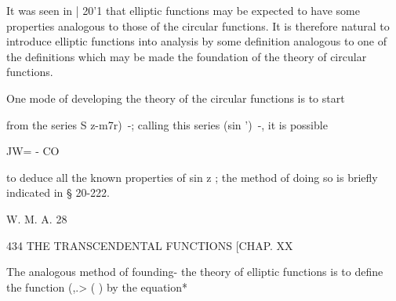 It was seen in | 20'1 that elliptic functions may be expected to have
some properties analogous to those of the circular functions. It is
therefore natural to introduce elliptic functions into analysis by
some definition analogous to one of the definitions which may be made
the foundation of the theory of circular functions.

One mode of developing the theory of the circular functions is to
start

from the series S z-m7r)~-; calling this series (sin ')~-, it is
possible

JW= - CO

to deduce all the known properties of sin z ; the method of doing so
is briefly indicated in § 20-222.

W. M. A. 28

434 THE TRANSCENDENTAL FUNCTIONS [CHAP. XX

The analogous method of founding- the theory of elliptic functions is
to define the function (,.> ( ) by the equation*

